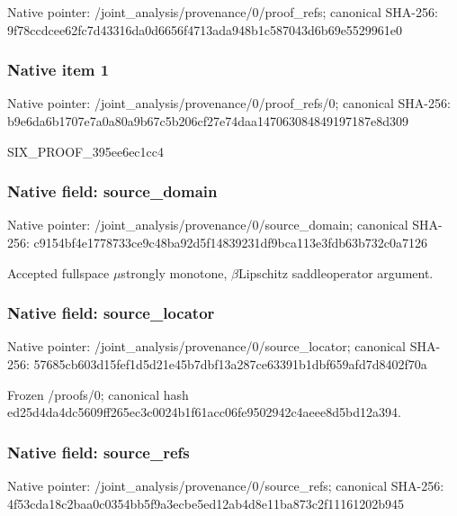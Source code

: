 \documentclass[10pt,a4paper]{article}
\begin{document}
Native pointer: /joint\_analysis/provenance/0/proof\_refs; canonical SHA-256: 9f78ccdcee62fc7d43316da0\allowbreak{}d6656f4713ada948b1c58704\allowbreak{}3d6b69e5529961e0



\subsubsection{Native item 1}


Native pointer: /joint\_analysis/provenan\allowbreak{}ce/0/proof\_refs/0; canonical SHA-256: b9e6da6b1707e7a0a80a9b67\allowbreak{}c5b206cf27e74daa14706308\allowbreak{}4849197187e8d309


SIX\_PROOF\_395ee6ec1cc4


\subsubsection{Native field: source\_domain}


Native pointer: /joint\_analysis/provenan\allowbreak{}ce/0/source\_domain; canonical SHA-256: c9154bf4e1778733ce9c48ba\allowbreak{}92d5f14839231df9bca113e3\allowbreak{}fdb63b732c0a7126


Accepted fullspace \ensuremath{\mu}strongly monotone, \ensuremath{\beta}Lipschitz saddleoperator argument.


\subsubsection{Native field: source\_locator}


Native pointer: /joint\_analysis/provenan\allowbreak{}ce/0/source\_locator; canonical SHA-256: 57685cb603d15fef1d5d21e4\allowbreak{}5b7dbf13a287ce63391b1dbf\allowbreak{}659afd7d8402f70a


Frozen /proofs/0; canonical hash ed25d4da4dc5609ff265ec3c\allowbreak{}0024b1f61acc06fe9502942c\allowbreak{}4aeee8d5bd12a394.


\subsubsection{Native field: source\_refs}


Native pointer: /joint\_analysis/provenan\allowbreak{}ce/0/source\_refs; canonical SHA-256: 4f53cda18c2baa0c0354bb5f\allowbreak{}9a3ecbe5ed12ab4d8e11ba87\allowbreak{}3c2f11161202b945
\end{document}
